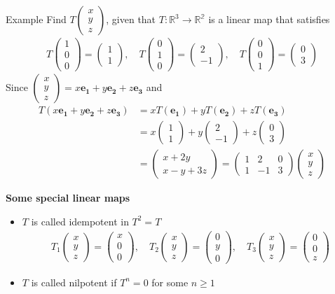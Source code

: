 \documentclass{report}
\renewcommand{\vec}{\mathbf}
\newcommand{\cvec}[1]{ \begin{pmatrix} #1 \end{pmatrix} }
\begin{document}
\begin{enumerate}
	\begin{question}{Example}
		Find $T\cvec{x\\y\\z}$, given that $T: \mathbb{R}^3 \to \mathbb{R^2}$ is a linear map that satisfies
		\begin{align*}
			T\cvec{1\\0\\0} = \cvec{1\\1}, \quad T\cvec{0\\1\\0} = \cvec{2\\-1}, \quad T \cvec{0\\0\\1} = \cvec{0\\3}
		\end{align*}
		Since $\cvec{x\\y\\z} = x \vec{e_1} + y \vec{e_2} + z \vec{e_3}$ and
		\begin{align*}
			T(x \vec{e_1} + y \vec{e_2} + z \vec{e_3}) &= x T(\vec{e_1}) + y T(\vec{e_2}) + z T(\vec{e_3})	\\
													   &= x \cvec{1\\1} + y \cvec{2\\-1} + z \cvec{0\\3}	\\
													   &= \cvec{x + 2y\\x-y+3z} = \cvec{1&2&0\\1&-1&3} \cvec{x\\y\\z}
		\end{align*}
	\end{question}
	
	\textbf{Some special linear maps}

		\begin{itemize}
			\item $T$ is called idempotent in $T^2 = T$
				\begin{align*}
					T_1\cvec{x\\y\\z} = \cvec{x\\0\\0}, \quad T_2\cvec{x\\y\\z} = \cvec{0\\y\\0}, \quad T_3\cvec{x\\y\\z} = \cvec{0\\0\\z}
				\end{align*}
			\item $T$ is called nilpotent if $T^n = 0$ for some $n \geq 1$
		\end{itemize}
	

\end{enumerate}
\end{document}
